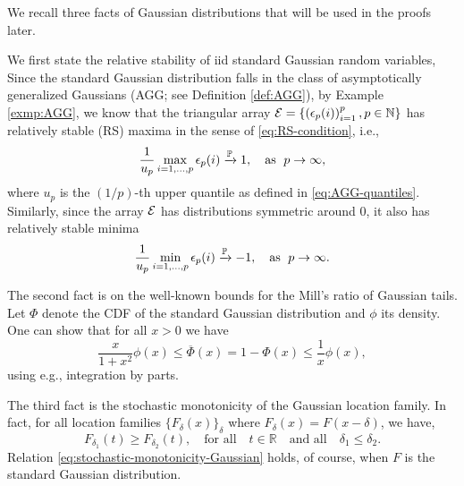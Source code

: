 
We recall three facts of Gaussian distributions that will be used in the proofs later.

We first state the relative stability of iid standard Gaussian random variables,
Since the standard Gaussian distribution falls in the class of asymptotically generalized Gaussians (AGG; see Definition \ref{def:AGG}), by Example \ref{exmp:AGG}, we know that the triangular array ${\cal E} = \{\left(\epsilon_p(i)\right)_{i=1}^p, p\in\N\}$ has relatively stable (RS) maxima in the sense of \eqref{eq:RS-condition}, i.e.,
\begin{equation} \label{eq:relative-stability-Gaussian-maxima}
    \frac{1}{u_{p}} \max_{i=1,\ldots,p} \epsilon_p(i) \xrightarrow{\P} 1,\quad \text{as }\;p\to\infty,
\end{equation}
where $u_p$ is the $(1/p)$-th upper quantile as defined in \eqref{eq:AGG-quantiles}.
Similarly, since the array ${\cal E}$ has distributions symmetric around 0, it also has relatively stable minima
\begin{equation} \label{eq:relative-stability-Gaussian-minima}
    \frac{1}{u_{p}} \min_{i=1,\ldots,p} \epsilon_p(i) \xrightarrow{\P} -1,\quad \text{as }\;p\to\infty.
\end{equation}

The second fact is on the well-known bounds for the Mill's ratio of Gaussian tails.
Let $\Phi$ denote the CDF of the standard Gaussian distribution and $\phi$ its density.
One can show that for all $x>0$ we have
\begin{equation} \label{eq:Mills-ratio}
    \frac{x}{1+x^2}\phi(x) \le \overline{\Phi}(x) = 1-\Phi(x) \le \frac{1}{x}\phi(x),
\end{equation}
using e.g., integration by parts.

The third fact is the stochastic monotonicity of the Gaussian location family. 
In fact, for all location families $\{F_\delta(x)\}_\delta$ where $F_\delta(x) = F(x-\delta)$, we have,
\begin{equation} \label{eq:stochastic-monotonicity-Gaussian}
    F_{\delta_1}(t) \ge F_{\delta_2}(t), \quad \text{for all}\quad t\in\mathbb{R}\quad\text{and all}\quad \delta_1 \le \delta_2.
\end{equation}
Relation \eqref{eq:stochastic-monotonicity-Gaussian} holds, of course, when $F$ is the standard Gaussian distribution. 
